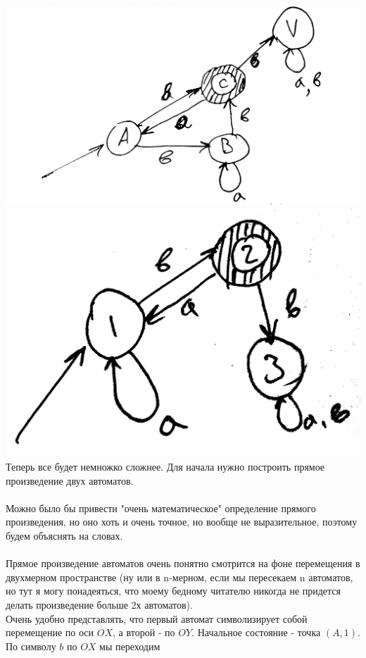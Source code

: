 \documentclass[14pt]{extreport}
\begin{document}
	\includegraphics[scale=0.1]{data/pic5_2.png}\includegraphics[scale=0.1]{data/pic5_5.png}\\
	Теперь все будет немножко сложнее. Для начала нужно построить прямое произведение
	двух автоматов.\\\\
	Можно было бы привести "очень математическое" определение прямого произведения, но оно
	хоть и очень точное, но вообще не выразительное, поэтому будем объяснять на словах.\\\\
	Прямое произведение автоматов очень понятно смотрится на фоне перемещения в двухмерном
	пространстве (ну или в n-мерном, если мы пересекаем n автоматов, но тут я могу понадеяться,
	что моему бедному читателю никогда не придется делать произведение больше 2х автоматов).\\
	Очень удобно представлять, что первый автомат символизирует собой перемещение по оси $OX$,
	а второй - по $OY$. Начальное состояние - точка $(A, 1)$. По символу $b$ по $OX$ мы переходим
\end{document}
